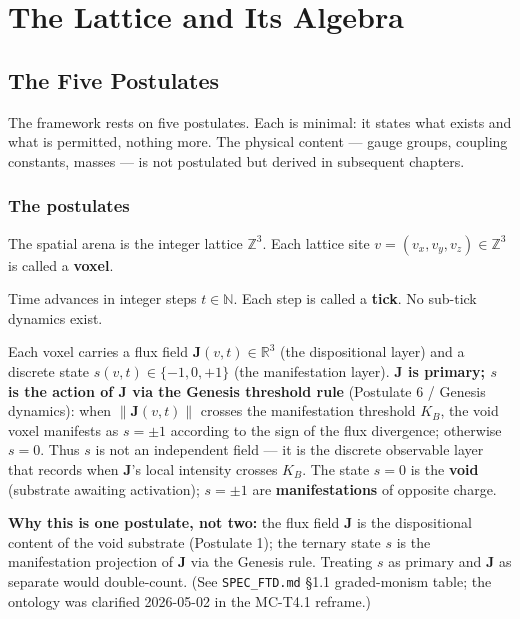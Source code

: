 \documentclass[
  11pt,
  letterpaper,
  twoside,
  openany]{book}
\makeatletter
\let\orig@section\section
\renewcommand{\section}{\needspace{8\baselineskip}\orig@section}
\makeatother
\begin{document}
\part{The Lattice and Its Algebra}

\chapter{The Five Postulates}\label{the-five-postulates}

The framework rests on five postulates. Each is minimal: it states what
exists and what is permitted, nothing more. The physical content ---
gauge groups, coupling constants, masses --- is not postulated but
derived in subsequent chapters.

\section{The postulates}\label{the-postulates}

\begin{ftdaxiom}

The spatial arena is the integer lattice \(\mathbb{Z}^3\). Each lattice
site \(v = (v_x, v_y, v_z) \in \mathbb{Z}^3\) is called a
\textbf{voxel}.

\end{ftdaxiom}

\begin{ftdaxiom}

Time advances in integer steps \(t \in \mathbb{N}\). Each step is called
a \textbf{tick}. No sub-tick dynamics exist.

\end{ftdaxiom}

\begin{ftdaxiom}

Each voxel carries a flux field \(\mathbf{J}(v, t) \in \mathbb{R}^3\)
(the dispositional layer) and a discrete state
\(s(v, t) \in \{-1, 0, +1\}\) (the manifestation layer).
\textbf{\(\mathbf{J}\) is primary; \(s\) is the action of \(\mathbf{J}\)
via the Genesis threshold rule} (Postulate 6 / Genesis dynamics): when
\(\|\mathbf{J}(v, t)\|\) crosses the manifestation threshold \(K_B\),
the void voxel manifests as \(s = \pm 1\) according to the sign of the
flux divergence; otherwise \(s = 0\). Thus \(s\) is not an independent
field --- it is the discrete observable layer that records when
\(\mathbf{J}\)'s local intensity crosses \(K_B\). The state \(s = 0\) is
the \textbf{void} (substrate awaiting activation); \(s = \pm 1\) are
\textbf{manifestations} of opposite charge.

\textbf{Why this is one postulate, not two:} the flux field
\(\mathbf{J}\) is the dispositional content of the void substrate
(Postulate 1); the ternary state \(s\) is the manifestation projection
of \(\mathbf{J}\) via the Genesis rule. Treating \(s\) as primary and
\(\mathbf{J}\) as separate would double-count. (See
\texttt{SPEC\_FTD.md} §1.1 graded-monism table; the ontology was
clarified 2026-05-02 in the MC-T4.1 reframe.)

\end{ftdaxiom}
\end{document}
